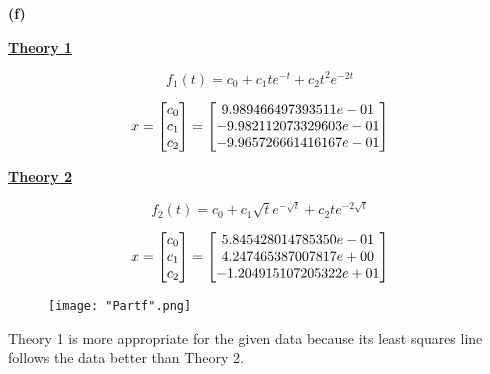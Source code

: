 \documentclass[final,12pt,reqno]{amsart}
\begin{document}
\newpage

\textbf{(f)}

\textbf{\underline{Theory 1}}

\[
	f_1(t) = c_0 + c_1te^{-t} + c_2t^2e^{-2t}
\]

\[
x =
\left[\begin{array}{@{}*{1}{c}@{}}
	  c_0\\
		c_1\\
		c_2
  \end{array} \right]
=
\left[\begin{array}{@{}*{1}{c}@{}}
	   9.989466497393511e-01\\
    -9.982112073329603e-01\\
    -9.965726661416167e-01
  \end{array} \right]
\]

\textbf{\underline{Theory 2}}

\[
	f_2(t) = c_0 + c_1\sqrt{t}e^{-\sqrt{t}} + c_2te^{-2\sqrt{t}}
\]

\[
x =
\left[\begin{array}{@{}*{1}{c}@{}}
	  c_0\\
		c_1\\
		c_2
  \end{array} \right]
=
\left[\begin{array}{@{}*{1}{c}@{}}
     5.845428014785350e-01\\
     4.247465387007817e+00\\
    -1.204915107205322e+01
  \end{array} \right]
\]

\begin{figure}[hbtp]
  \begin{center}
    \texttt{[image: "Partf".png]}
    \caption{}
  \end{center}
\end{figure}

Theory 1 is more appropriate for the given data because its least squares line follows the data better than Theory 2.
\end{document}
